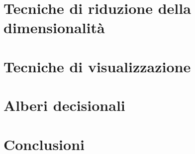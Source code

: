 \documentclass[11pt,a4paper,twocolumn]{article}
\begin{document}
\section{Tecniche di riduzione della dimensionalità}
\section{Tecniche di visualizzazione}
\section{Alberi decisionali}
\section{Conclusioni}
\end{document}
